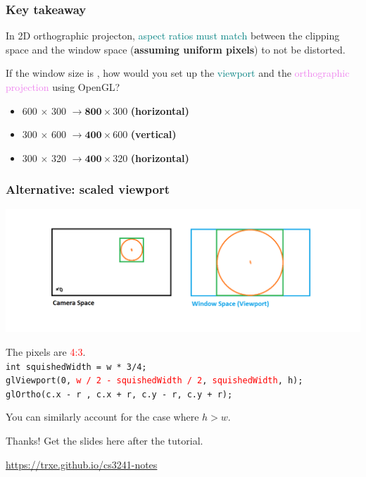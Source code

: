 \documentclass{beamer}
\begin{document}
\begin{frame}
    \frametitle{Key takeaway}

    In 2D orthographic projecton, \textcolor{teal}{aspect ratios must match} between 
    the clipping space and the window space (\textbf{assuming uniform pixels})
    to not be distorted.

    \begin{tcolorbox}
        If the window size is \underline{\quad\quad}, how would you set up the \textcolor{teal}{viewport} and the
        \textcolor{violet}{orthographic projection} using OpenGL?
        \begin{itemize}
            \item 600 $\times$ 300 $\rightarrow \textbf{800} \times 300$ \textbf{(horizontal)}
            \item 300 $\times$ 600 $\rightarrow \textbf{400} \times 600$ \textbf{(vertical)}
            \item 300 $\times$ 320 $\rightarrow \textbf{400} \times 320$ \textbf{(horizontal)}
        \end{itemize}
    \end{tcolorbox}

\end{frame}

\begin{frame}
    \frametitle{Alternative: scaled viewport}

    \begin{center}
        \includegraphics[scale=0.3]{q7-cam-win-4.png}
    \end{center}

    \begin{tcolorbox}
        \small
        The pixels are \textcolor{red}{4:3}.\\
        \texttt{int squishedWidth = w * 3/4;}\\
        \texttt{glViewport(0, \textcolor{red}{w / 2 - squishedWidth / 2}, \textcolor{red}{squishedWidth}, h);}\\
        \texttt{glOrtho(c.x - r , c.x + r, c.y - r, c.y + r);}
    \end{tcolorbox}

    You can similarly account for the case where $h > w$.

\end{frame}

\ThankYou
\begin{frame}
    Thanks! Get the slides here after the tutorial.\\
    \vspace{2em}
    \scalebox{3}{\faGithub}\par\bigskip
    \url{https://trxe.github.io/cs3241-notes}
\end{frame}
\end{document}
